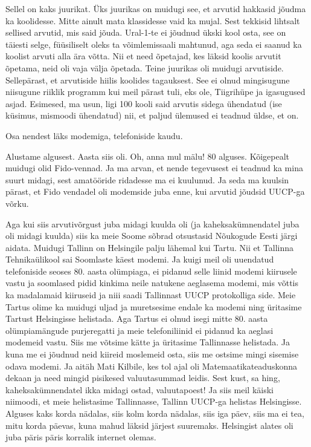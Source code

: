 
Sellel on kaks juurikat. Üks juurikas on muidugi see, et arvutid hakkasid jõudma ka koolidesse. Mitte ainult mata klassidesse vaid ka mujal. Sest tekkisid lihtsalt sellised arvutid, mis said jõuda. Ural-1-te ei jõudnud ükski kool osta, see on täiesti selge, füüsiliselt oleks ta võimlemissaali  mahtunud, aga seda ei saanud ka koolist arvuti alla ära võtta. Nii et need õpetajad, kes läksid koolis arvutit õpetama, neid oli vaja välja õpetada. Teine juurikas oli muidugi arvutiside. Sellepärast, et arvutiside hiilis koolides tagauksest. See ei olnud mingisugune niisugune riiklik programm kui meil pärast tuli, eks ole, Tiigrihüpe ja igasugused asjad. Esimesed, ma usun, ligi 100 kooli said arvutis sidega ühendatud (ise küsimus, mismoodi ühendatud) nii, et paljud ülemused ei teadnud üldse, et on. 


Osa nendest läks modemiga, telefoniside kaudu. 


Alustame algusest. Aasta siis oli. Oh, anna mul mälu! 80 alguses. Kõigepealt muidugi olid Fido-vennad. Ja ma arvan, et nende tegevusest ei teadnud ka mina suurt midagi, sest amatööride ridadesse ma ei kuulunud. Ja seda ma kuulsin pärast, et Fido vendadel oli modemside juba enne, kui arvutid jõudsid UUCP-ga võrku. 

Aga kui siis arvutivõrgust juba midagi kuulda oli (ja kaheksakümnendatel juba oli midagi kuulda) siis ka meie Soome sõbrad otsustasid Nõukogude Eesti järgi aidata. Muidugi Tallinn on Helsingile palju lähemal kui Tartu. Nii et Tallinna Tehnikaülikool sai Soomlaste käest modemi. Ja kuigi meil oli uuendatud telefoniside seoses 80. aasta olümpiaga, ei pidanud selle liinid modemi kiirusele vastu ja soomlased pidid kinkima neile natukene aeglasema modemi, mis võttis ka madalamaid kiiruseid ja niii saadi Tallinnast UUCP protokolliga side. Meie Tartus olime ka muidugi uljad ja muretsesime endale ka modemi ning üritasime Tartust Helsingisse helistada. Aga Tartus ei olnud isegi mitte 80. aasta olümpiamängude purjeregatti ja meie telefoniliinid ei pidanud ka aeglasi modemeid  vastu. Siis me võtsime kätte ja üritasime Tallinnasse helistada. Ja kuna me ei jõudnud neid kiireid moslemeid osta, siis me ostsime mingi sisemise odava modemi. Ja aitäh Mati Kilbile, kes tol ajal oli Matemaatikateaduskonna dekaan ja need mingid pisikesed valuutasummad leidis. Sest kust, sa hing, kaheksakümnendatel ikka midagi ostad, valuutapoest! Ja siis meil käiski niimoodi, et meie helistasime Tallinnasse, Tallinn UUCP-ga helistas Helsingisse. Alguses kaks korda nädalas, siis kolm korda nädalas, siis iga päev, siis ma ei tea, mitu korda päevas, kuna mahud läksid järjest suuremaks. Helsingist alates oli juba päris päris korralik internet olemas. 

